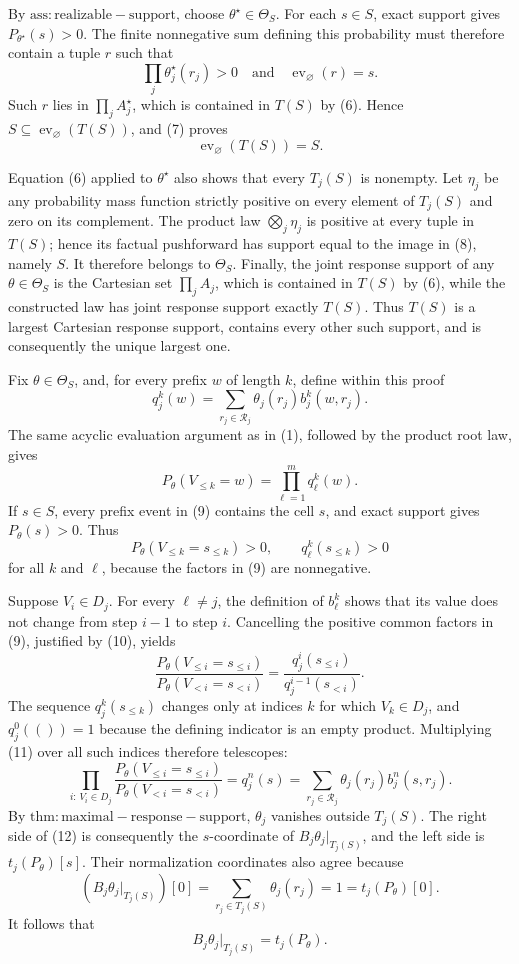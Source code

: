 By \(\mathrm{ass:realizable-support}\), choose \(\theta^\star\in\Theta_S\).  For each \(s\in S\), exact support gives \(P_{\theta^\star}(s)>0\).  The finite nonnegative sum defining this probability must therefore contain a tuple \(r\) such that
\[
\prod_j\theta_j^\star(r_j)>0
\quad\text{and}\quad
\operatorname{ev}_{\varnothing}(r)=s.
\]
Such \(r\) lies in \(\prod_j A_j^\star\), which is contained in \(T(S)\) by (6).  Hence \(S\subseteq\operatorname{ev}_{\varnothing}(T(S))\), and (7) proves
\[
\operatorname{ev}_{\varnothing}(T(S))=S.                     \tag{8}
\]

Equation (6) applied to \(\theta^\star\) also shows that every \(T_j(S)\) is nonempty.  Let \(\eta_j\) be any probability mass function strictly positive on every element of \(T_j(S)\) and zero on its complement.  The product law \(\bigotimes_j\eta_j\) is positive at every tuple in \(T(S)\); hence its factual pushforward has support equal to the image in (8), namely \(S\).  It therefore belongs to \(\Theta_S\).  Finally, the joint response support of any \(\theta\in\Theta_S\) is the Cartesian set \(\prod_j A_j\), which is contained in \(T(S)\) by (6), while the constructed law has joint response support exactly \(T(S)\).  Thus \(T(S)\) is a largest Cartesian response support, contains every other such support, and is consequently the unique largest one.

Fix \(\theta\in\Theta_S\), and, for every prefix \(w\) of length \(k\), define within this proof
\[
q_j^k(w)=\sum_{r_j\in\mathcal R_j}\theta_j(r_j)b_j^k(w,r_j).
\]
The same acyclic evaluation argument as in (1), followed by the product root law, gives
\[
P_\theta(V_{\le k}=w)=\prod_{\ell=1}^m q_\ell^k(w).          \tag{9}
\]
If \(s\in S\), every prefix event in (9) contains the cell \(s\), and exact support gives \(P_\theta(s)>0\).  Thus
\[
P_\theta(V_{\le k}=s_{\le k})>0,
\qquad
q_\ell^k(s_{\le k})>0                                       \tag{10}
\]
for all \(k\) and \(\ell\), because the factors in (9) are nonnegative.

Suppose \(V_i\in D_j\).  For every \(\ell\ne j\), the definition of \(b_\ell^k\) shows that its value does not change from step \(i-1\) to step \(i\).  Cancelling the positive common factors in (9), justified by (10), yields
\[
\frac{P_\theta(V_{\le i}=s_{\le i})}
     {P_\theta(V_{<i}=s_{<i})}
=\frac{q_j^i(s_{\le i})}{q_j^{i-1}(s_{<i})}.                 \tag{11}
\]
The sequence \(q_j^k(s_{\le k})\) changes only at indices \(k\) for which \(V_k\in D_j\), and \(q_j^0(())=1\) because the defining indicator is an empty product.  Multiplying (11) over all such indices therefore telescopes:
\[
\prod_{i:\,V_i\in D_j}
\frac{P_\theta(V_{\le i}=s_{\le i})}
     {P_\theta(V_{<i}=s_{<i})}
=q_j^n(s)
=\sum_{r_j\in\mathcal R_j}\theta_j(r_j)b_j^n(s,r_j).        \tag{12}
\]
By \(\mathrm{thm:maximal-response-support}\), \(\theta_j\) vanishes outside \(T_j(S)\).  The right side of (12) is consequently the \(s\)-coordinate of \(B_j\theta_j|_{T_j(S)}\), and the left side is \(t_j(P_\theta)[s]\).  Their normalization coordinates also agree because
\[
(B_j\theta_j|_{T_j(S)})[0]
=\sum_{r_j\in T_j(S)}\theta_j(r_j)=1=t_j(P_\theta)[0].
\]
It follows that
\[
B_j\theta_j|_{T_j(S)}=t_j(P_\theta).                          \tag{13}
\]

